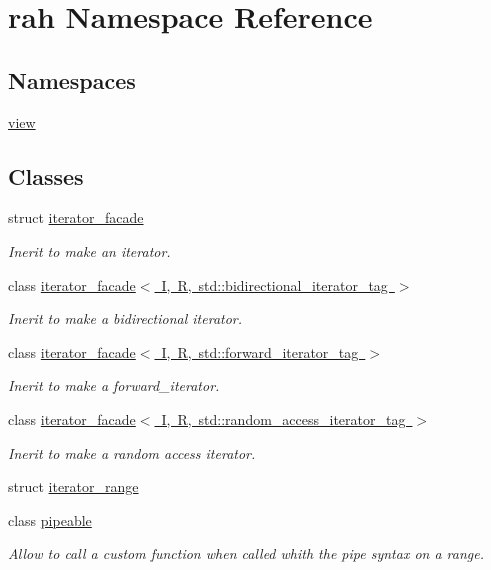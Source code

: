 \hypertarget{namespacerah}{}\section{rah Namespace Reference}
\label{namespacerah}
\subsection*{Namespaces}
\begin{DoxyCompactItemize}
\item 
 \mbox{\hyperlink{namespacerah_1_1view}{view}}
\end{DoxyCompactItemize}
\subsection*{Classes}
\begin{DoxyCompactItemize}
\item 
struct \mbox{\hyperlink{structrah_1_1iterator__facade}{iterator\+\_\+facade}}
\begin{DoxyCompactList}\small\item\em Inerit to make an iterator. \end{DoxyCompactList}\item 
class \mbox{\hyperlink{structrah_1_1iterator__facade_3_01_i_00_01_r_00_01std_1_1bidirectional__iterator__tag_01_4}{iterator\+\_\+facade$<$ I, R, std\+::bidirectional\+\_\+iterator\+\_\+tag $>$}}
\begin{DoxyCompactList}\small\item\em Inerit to make a bidirectional iterator. \end{DoxyCompactList}\item 
class \mbox{\hyperlink{structrah_1_1iterator__facade_3_01_i_00_01_r_00_01std_1_1forward__iterator__tag_01_4}{iterator\+\_\+facade$<$ I, R, std\+::forward\+\_\+iterator\+\_\+tag $>$}}
\begin{DoxyCompactList}\small\item\em Inerit to make a forward\+\_\+iterator. \end{DoxyCompactList}\item 
class \mbox{\hyperlink{structrah_1_1iterator__facade_3_01_i_00_01_r_00_01std_1_1random__access__iterator__tag_01_4}{iterator\+\_\+facade$<$ I, R, std\+::random\+\_\+access\+\_\+iterator\+\_\+tag $>$}}
\begin{DoxyCompactList}\small\item\em Inerit to make a random access iterator. \end{DoxyCompactList}\item 
struct \mbox{\hyperlink{structrah_1_1iterator__range}{iterator\+\_\+range}}
\item 
class \mbox{\hyperlink{structrah_1_1pipeable}{pipeable}}
\begin{DoxyCompactList}\small\item\em Allow to call a custom function when called whith the \textquotesingle{}pipe\textquotesingle{} syntax on a range. \end{DoxyCompactList}\end{DoxyCompactItemize}
